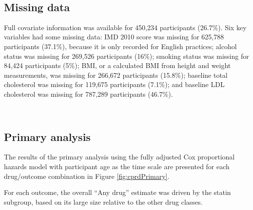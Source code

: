 \documentclass[a4paper, twoside]{templates/ociamthesis}
\begin{document}
~

\hypertarget{missing-data-1}{%
\subsection{Missing data}\label{missing-data-1}}

Full covariate information was available for 450,234 participants (26.7\%). Six key variables had some missing data: IMD 2010 score was missing for 625,788 participants (37.1\%), because it is only recorded for English practices; alcohol status was missing for 269,526 participants (16\%); smoking status was missing for 84,424 participants (5\%); BMI, or a calculated BMI from height and weight measurements, was missing for 266,672 participants (15.8\%); baseline total cholesterol was missing for 119,675 participants (7.1\%); and baseline LDL cholesterol was missing for 787,289 participants (46.7\%).

~

\hypertarget{primary-analysis}{%
\subsection{Primary analysis}\label{primary-analysis}}

The results of the primary analysis using the fully adjusted Cox proportional hazards model with participant age as the time scale are presented for each drug/outcome combination in Figure \ref{fig:cprdPrimary}.

For each outcome, the overall ``Any drug'' estimate was driven by the statin subgroup, based on its large size relative to the other drug classes.

~
\end{document}
